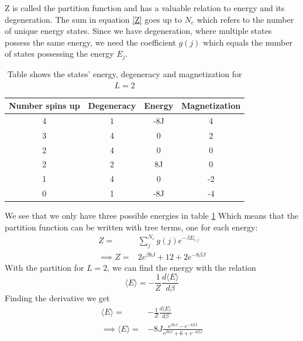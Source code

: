 \documentclass[%
oneside,                 %
final,                   %
10pt]{article}
\begin{document}
Z is called the partition function and has a valuable relation to energy and its degeneration.
The sum in equation \ref{Z} goes up to $N_e$ which refers to the number of unique energy states.
Since we have degeneration, where multiple states possess the same energy, we need the coefficient $g(j)$ which equals the number of states possessing the energy $E_{j}$.
\begin{table}
\begin{center}
\begin{tabular}{|c  c  c  c | }
  \hline
   Number spins up    &Degeneracy& Energy & Magnetization \\ \hline
   4 & 1 & -8J&4  \\ \hline
   3 & 4 & 0&  2 \\ \hline
   2 & 4 & 0&  0\\ \hline
   2 & 2 & 8J& 0 \\ \hline
   1 & 4 & 0&  -2\\ \hline
   0 & 1 & -8J& -4 \\ 
  \hline
\end{tabular}
\caption{Table shows the states' energy, degeneracy and magnetization for $L=2$ }
\label{tab1}
\end{center}
\end{table}
We see that we only have three possible energies in table \ref{tab1}
Which means that the partition function can be written with tree terms, one for each energy:
\begin{equation}
\begin{split}
  Z =& \sum_{j}^{N_e} g(j)e^{-\beta E_{i,j}} \\
  \implies Z =& 2e^{\beta 8J} + 12 + 2e^{-8\beta J}
\end{split}
 \end{equation}
With the partition for $L=2$, we can find the energy with the relation
$$\langle E \rangle = -\frac{1}{Z} \frac{d\langle E \rangle}{d\beta}$$
Finding the derivative we get
\begin{equation}
\begin{split}
  \langle E \rangle =& -\frac{1}{Z} \frac{d\langle E \rangle}{d\beta} \\
  \implies \langle E \rangle =& -8J\frac{e^{\beta 8J} - e^{-8\beta J}}{e^{\beta 8J} + 6 + e^{-8\beta J}}
\end{split}
 \end{equation}
\end{document}
